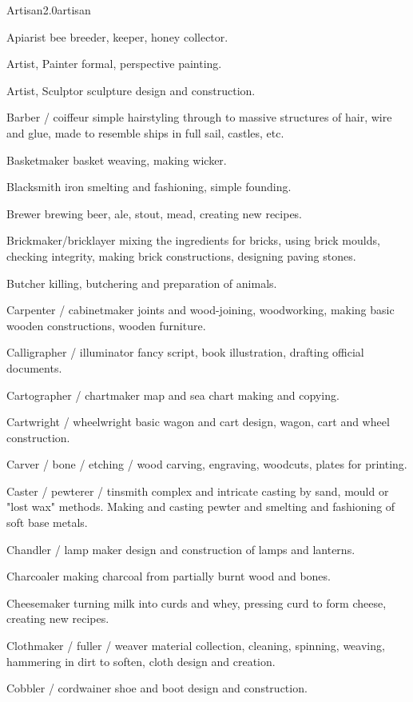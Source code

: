 \begin{skill}{Artisan}{2.0}{artisan}
\begin{Description}
\item[Apiarist] bee breeder, keeper, honey collector.
\item[Artist, Painter] formal, perspective painting.
\item[Artist, Sculptor] sculpture design and construction.
\item[Barber / coiffeur] simple hairstyling through to massive structures of hair, wire and glue, made to resemble ships in full sail, castles, etc.
\item[Basketmaker] basket weaving, making wicker.
\item[Blacksmith] iron smelting and fashioning, simple founding.
\item[Brewer] brewing beer, ale, stout, mead, creating new recipes.
\item[Brickmaker/bricklayer] mixing the ingredients for bricks, using brick moulds, checking integrity, making brick constructions, designing paving stones.
\item[Butcher] killing, butchering and preparation of animals.
\item[Carpenter / cabinetmaker] joints and wood-\-joining, woodworking, making basic wooden constructions, wooden furniture.
\item[Calligrapher / illuminator] fancy script, book illustration, drafting official documents.
\item[Cartographer / chartmaker] map and sea chart making and copying.
\item[Cartwright / wheelwright] basic wagon and cart design, wagon, cart and wheel construction.
\item[Carver / bone / etching / wood] carving, engraving, woodcuts, plates for printing.
\item[Caster / pewterer / tinsmith] complex and intricate casting by sand, mould or "lost wax" methods.  Making and casting pewter and smelting and fashioning of soft base metals.
\item[Chandler / lamp maker] design and construction of lamps and lanterns.
\item[Charcoaler] making charcoal from partially burnt wood and bones.
\item[Cheesemaker] turning milk into curds and whey, pressing curd to form cheese, creating new recipes.
\item[Clothmaker / fuller / weaver] material collection, cleaning, spinning, weaving, hammering in dirt to soften, cloth design and creation.
\item[Cobbler / cordwainer] shoe and boot design and construction.

\end{Description}
\end{skill}
